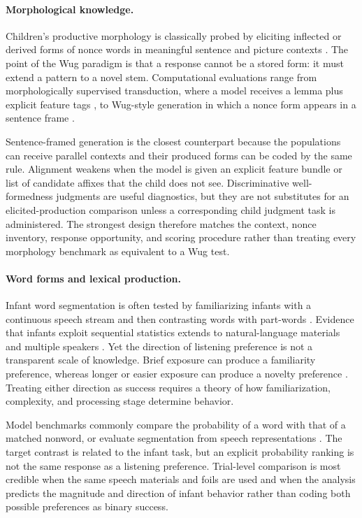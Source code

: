 \paragraph{Morphological knowledge.}
Children's productive morphology is classically probed by eliciting inflected or derived forms of nonce words in meaningful sentence and picture contexts \citep{BerkoGleason1958,ENGELMANN201930,Seidl2021,Grigorakis2022,Michaly2024}. The point of the Wug paradigm is that a response cannot be a stored form: it must extend a pattern to a novel stem. Computational evaluations range from morphologically supervised transduction, where a model receives a lemma plus explicit feature tags \citep{Cotterell2017}, to Wug-style generation in which a nonce form appears in a sentence frame \citep{weissweiler2023counting,anh2024morphology}.

Sentence-framed generation is the closest counterpart because the populations can receive parallel contexts and their produced forms can be coded by the same rule. Alignment weakens when the model is given an explicit feature bundle or list of candidate affixes that the child does not see. Discriminative well-formedness judgments are useful diagnostics, but they are not substitutes for an elicited-production comparison unless a corresponding child judgment task is administered. The strongest design therefore matches the context, nonce inventory, response opportunity, and scoring procedure rather than treating every morphology benchmark as equivalent to a Wug test.

\paragraph{Word forms and lexical production.}
Infant word segmentation is often tested by familiarizing infants with a continuous speech stream and then contrasting words with part-words \citep{Saffran1996,Aslin1998}. Evidence that infants exploit sequential statistics extends to natural-language materials and multiple speakers \citep{Pelucchi2009,GrafEstes2012}. Yet the direction of listening preference is not a transparent scale of knowledge. Brief exposure can produce a familiarity preference, whereas longer or easier exposure can produce a novelty preference \citep{hunter1988multifactor,houston2004distinguishing}. Treating either direction as success requires a theory of how familiarization, complexity, and processing stage determine behavior.

Model benchmarks commonly compare the probability of a word with that of a matched nonword, or evaluate segmentation from speech representations \citep{nguyen2022word,dunbar2021zero}. The target contrast is related to the infant task, but an explicit probability ranking is not the same response as a listening preference. Trial-level comparison is most credible when the same speech materials and foils are used and when the analysis predicts the magnitude and direction of infant behavior rather than coding both possible preferences as binary success.

